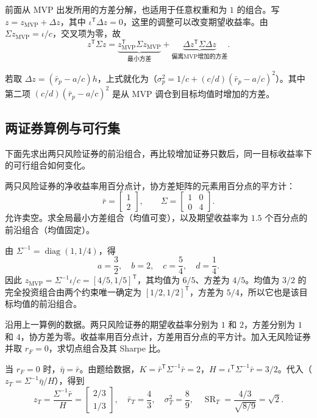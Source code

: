 前面从 MVP 出发所用的方差分解，也适用于任意权重和为 $1$ 的组合。写 $z=z_{\mathrm{MVP}}+\Delta z$，其中 $\iota^{\mathsf T}\Delta z=0$，这里的调整可以改变期望收益率。由 $\Sigma z_{\mathrm{MVP}}=\iota/c$，交叉项为零，故
\[
 z^{\mathsf T}\Sigma z=\underbrace{z_{\mathrm{MVP}}^{\mathsf T}\Sigma z_{\mathrm{MVP}}}_{\text{最小方差}}+\underbrace{\Delta z^{\mathsf T}\Sigma \Delta z}_{\text{偏离MVP增加的方差}}.
\]

若取 $\Delta z=(\bar r_p-a/c)h$，上式就化为（$\sigma_p^2=1/c+(c/d)(\bar r_p-a/c)^2$）。其中第二项 $(c/d)(\bar r_p-a/c)^2$ 是从 MVP 调仓到目标均值时增加的方差。

\subsection*{两证券算例与可行集}
下面先求出两只风险证券的前沿组合，再比较增加证券只数后，同一目标收益率下的可行组合如何变化。

\begin{tcolorbox}[example,title=补充算例：两只风险证券的前沿]
两只风险证券的净收益率用百分点计，协方差矩阵的元素用百分点的平方计：
\[
 \bar r=\begin{bmatrix}1\\2\end{bmatrix},\qquad
 \Sigma=\begin{bmatrix}1&0\\0&4\end{bmatrix}.
\]
允许卖空。求全局最小方差组合（均值可变），以及期望收益率为 $1.5$ 个百分点的前沿组合（均值固定）。
\begin{solution}[blank-type=manual,blank-vsep=3\baselineskip]
由 $\Sigma^{-1}=\operatorname{diag}(1,1/4)$，得
\[
 a=\frac32,\quad b=2,\quad c=\frac54,\quad d=\frac14.
\]
因此 $z_{\mathrm{MVP}}=\Sigma^{-1}\iota/c=[4/5,1/5]^{\mathsf T}$，其均值为 $6/5$、方差为 $4/5$。均值为 $3/2$ 的完全投资组合由两个约束唯一确定为 $[1/2,1/2]^{\mathsf T}$，方差为 $5/4$，所以它也是该目标均值的前沿组合。
\end{solution}
\end{tcolorbox}

\begin{tcolorbox}[example,title=补充算例：两只风险证券的切点组合]
沿用上一算例的数据。两只风险证券的期望收益率分别为 $1$ 和 $2$，方差分别为 $1$ 和 $4$，协方差为零。收益率用百分点计，方差用百分点的平方计。加入无风险证券并取 $r_F=0$，求切点组合及其 Sharpe 比。
\begin{solution}[blank-type=manual,blank-vsep=2\baselineskip]
当 $r_F=0$ 时，$\bar\eta=\bar r$。由题给数据，$K=\bar r^{\mathsf T}\Sigma^{-1}\bar r=2$，$H=\iota^{\mathsf T}\Sigma^{-1}\bar r=3/2$。代入（$z_T=\Sigma^{-1}\bar\eta/H$），得到
\[
 z_T=\frac{\Sigma^{-1}\bar r}{H}
 =\begin{bmatrix}2/3\\1/3\end{bmatrix},\quad
 \bar r_T=\frac43,\quad \sigma_T^2=\frac89,\quad
 \operatorname{SR}_T=\frac{4/3}{\sqrt{8/9}}=\sqrt2.
\]
\end{solution}
\end{tcolorbox}

